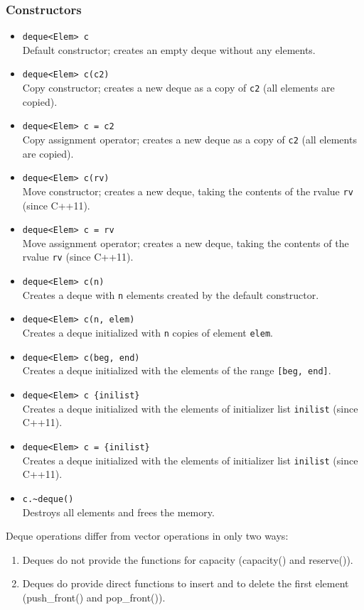 \documentclass{report}
\begin{document}
    \bigbreak \noindent 
    \subsubsection{Constructors}
    \begin{itemize}
    \item \texttt{deque<Elem> c} \\
        Default constructor; creates an empty deque without any elements.
    \item \texttt{deque<Elem> c(c2)} \\
        Copy constructor; creates a new deque as a copy of \texttt{c2} (all elements are copied).
    \item \texttt{deque<Elem> c = c2} \\
        Copy assignment operator; creates a new deque as a copy of \texttt{c2} (all elements are copied).
    \item \texttt{deque<Elem> c(rv)} \\
        Move constructor; creates a new deque, taking the contents of the rvalue \texttt{rv} (since C++11).
    \item \texttt{deque<Elem> c = rv} \\
        Move assignment operator; creates a new deque, taking the contents of the rvalue \texttt{rv} (since C++11).
    \item \texttt{deque<Elem> c(n)} \\
        Creates a deque with \texttt{n} elements created by the default constructor.
    \item \texttt{deque<Elem> c(n, elem)} \\
        Creates a deque initialized with \texttt{n} copies of element \texttt{elem}.
    \item \texttt{deque<Elem> c(beg, end)} \\
        Creates a deque initialized with the elements of the range \texttt{[beg, end]}.
    \item \texttt{deque<Elem> c \{inilist\}} \\
        Creates a deque initialized with the elements of initializer list \texttt{inilist} (since C++11).
    \item \texttt{deque<Elem> c = \{inilist\}} \\
        Creates a deque initialized with the elements of initializer list \texttt{inilist} (since C++11).
    \item \texttt{c.\textasciitilde deque()} \\
        Destroys all elements and frees the memory.
\end{itemize}
\bigbreak \noindent 
Deque operations differ from vector operations in only two ways:
\begin{enumerate}
    \item Deques do not provide the functions for capacity (capacity() and reserve()).
    \item Deques do provide direct functions to insert and to delete the first element (push\_front() and pop\_front()).
\end{enumerate}
\end{document}
